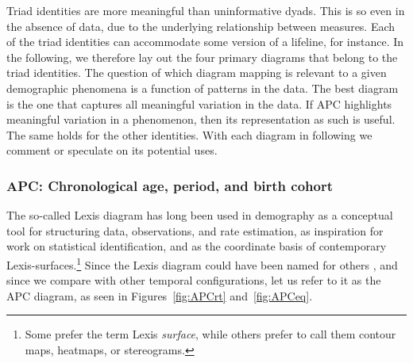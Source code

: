 \documentclass[12pt,oneside,a4paper]{article} %
\newcommand\tgh[1]{\raisebox{-.25\height}{\texttt{[image: Figures/triadtable/triad\#1.pdf]}}}
\begin{document}
Triad identities are more meaningful than uninformative dyads. This
is so even in the absence of data, due to the underlying relationship between
measures. Each of the triad identities can accommodate some version of a
lifeline, for instance. In the following, we therefore lay out the four primary
diagrams that belong to the triad identities. The question of which diagram
mapping is relevant to a given demographic phenomena is a function of
patterns in the data. The best diagram is the one that captures all meaningful
variation in the data. If APC highlights meaningful variation in a phenomenon,
then its representation as such is useful. The same holds for the other
identities. With each diagram in following we comment or speculate on its
potential uses.

\subsubsection{APC: Chronological age, period, and birth cohort}%
\FloatBarrier
The so-called Lexis diagram has long been used in demography as a conceptual
tool for structuring data, observations, and rate estimation, as inspiration for work
on statistical identification, and as the coordinate basis of contemporary
Lexis-surfaces.\footnote{Some prefer the term Lexis \textit{surface}, while
others prefer to call them contour maps, heatmaps, or stereograms.}
Since the Lexis diagram could have been named for others
\citep{keiding2011age, vandeschrick2001lexis}, and since we compare with other
temporal configurations, let us refer to it as the APC diagram, as seen in
Figures~\ref{fig:APCrt} and~\ref{fig:APCeq}. 
\end{document}
